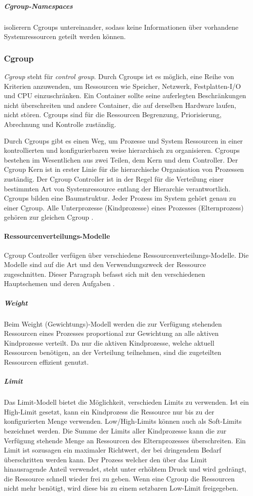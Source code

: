 \subparagraph{Cgroup-Namespaces} isolierern Cgroups untereinander, sodass keine Informationen über vorhandene Systemressourcen geteilt werden können.



\subsubsection{Cgroup}
\emph{Cgroup} steht für \emph{control group}. Durch Cgroups ist es möglich, eine Reihe von Kriterien anzuwenden, um Ressourcen wie Speicher, Netzwerk, Festplatten-I/O und CPU einzuschränken. Ein Container sollte seine auferlegten Beschränkungen nicht überschreiten und andere Container, die auf derselben Hardware laufen, nicht stören. Cgroups sind für die Ressourcen Begrenzung, Priorisierung, Abrechnung und Kontrolle zuständig.

Durch Cgroups gibt es einen Weg, um Prozesse und System Ressourcen in einer kontrollierten und konfigurierbaren weise hierarchisch zu organisieren. Cgroups bestehen im Wesentlichen aus zwei Teilen, dem Kern und dem Controller. Der Cgroup Kern ist in erster Linie für die hierarchische Organisation von Prozessen zuständig. Der Cgroup Controller ist in der Regel für die Verteilung einer bestimmten Art von Systemressource entlang der Hierarchie verantwortlich. Cgroups bilden eine Baumstruktur. Jeder Prozess im System gehört genau zu einer Cgroup. Alle Unterprozesse (Kindprozesse) eines Prozesses (Elternprozess) gehören zur gleichen Cgroup \cite{Heo2015ControlV2}. 


\paragraph{Ressourcenverteilungs-Modelle}
Cgroup Controller verfügen über verschiedene Ressourcenverteilungs-Modelle. Die Modelle sind auf die Art und den Verwendungszweck der Ressource zugeschnitten. Dieser Paragraph befasst sich mit den verschiedenen Hauptschemen und deren Aufgaben \cite{Heo2015ControlV2}.

\subparagraph{Weight}
Beim Weight (Gewichtungs)-Modell werden die zur Verfügung stehenden Ressourcen eines Prozesses proportional zur Gewichtung an alle aktiven Kindprozesse verteilt. Da nur die aktiven Kindprozesse, welche aktuell Ressourcen benötigen, an der Verteilung teilnehmen, sind die zugeteilten Ressourcen effizient genutzt. 

\subparagraph{Limit}
Das Limit-Modell bietet die Möglichkeit, verschieden Limits zu verwenden. Ist ein High-Limit gesetzt, kann ein Kindprozess die Ressource nur bis zu der konfigurierten Menge verwenden. Low/High-Limits können auch als Soft-Limits bezeichnet werden. Die Summe der Limits aller Kindprozesse kann die zur Verfügung stehende Menge an Ressourcen des Elternprozesses überschreiten. Ein Limit ist sozusagen ein maximaler Richtwert, der bei dringendem Bedarf überschritten werden kann. Der Prozess welcher den über das Limit hinausragende Anteil verwendet, steht unter erhöhtem Druck und wird gedrängt, die Ressource schnell wieder frei zu geben. Wenn eine Cgroup die Ressourcen nicht mehr benötigt, wird diese bis zu einem setzbaren Low-Limit freigegeben.


